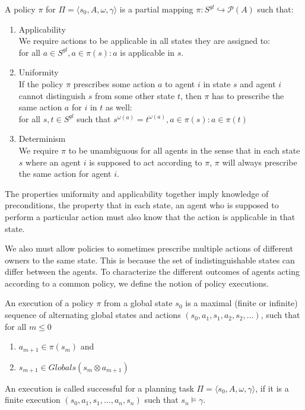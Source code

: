 A policy $\pi$ for $\Pi = \langle s_0, A, \omega, \gamma \rangle$ is a partial mapping $\pi: S^{gl} \hookrightarrow \mathcal{P}(A)$ such that:
\begin{enumerate}
  \item Applicability\\
    We require actions to be applicable in all states they are assigned to: \\
    for all $a \in S^{gl}, a \in \pi(s): a$ is applicable in $s$.
  \item Uniformity \\
    If the policy $\pi$ prescribes some action $a$ to agent $i$ in state $s$ and agent $i$ cannot distinguish $s$ from some other state $t$, then $\pi$ has to prescribe the same action $a$ for $i$ in $t$ as well: \\
    for all $s,t \in S^{gl} $ such that $ s^{\omega(a)} = t^{\omega(a)}, a \in \pi(s): a \in \pi(t)$
  \item Determinism \\
    We require $\pi$ to be unambiguous for all agents in the sense that in each state $s$ where an agent $i$ is supposed to act according to $\pi$, $\pi$ will always prescribe the same action for agent $i$.
\end{enumerate}

The properties uniformity and applicability together imply knowledge of preconditions, the property that in each state, an agent who is supposed to perform a particular action must also know that the action is applicable in that state.

We also must allow policies to sometimes prescribe multiple actions of different owners to the same state. This is because the set of indistinguishable states can differ between the agents. To characterize the different outcomes of agents acting according to a common policy, we define the notion of policy executions.

An execution of a policy $\pi$ from a global state $s_0$ is a maximal (finite or infinite) sequence of alternating global states and actions $(s_0, a_1, s_1, a_2, s_2,...)$, such that for all $ m \leq 0$
\begin{enumerate}
  \item $a_{m+1} \in \pi(s_m)$ and
  \item $s_{m+1} \in Globals(s_m \otimes a_{m+1})$
\end{enumerate}
An execution is called successful for a planning task $\Pi = \langle s_0, A, \omega, \gamma \rangle$, if it is a finite execution $(s_0, a_1, s_1,...,a_n, s_n)$ such that $s_n \models \gamma$.

